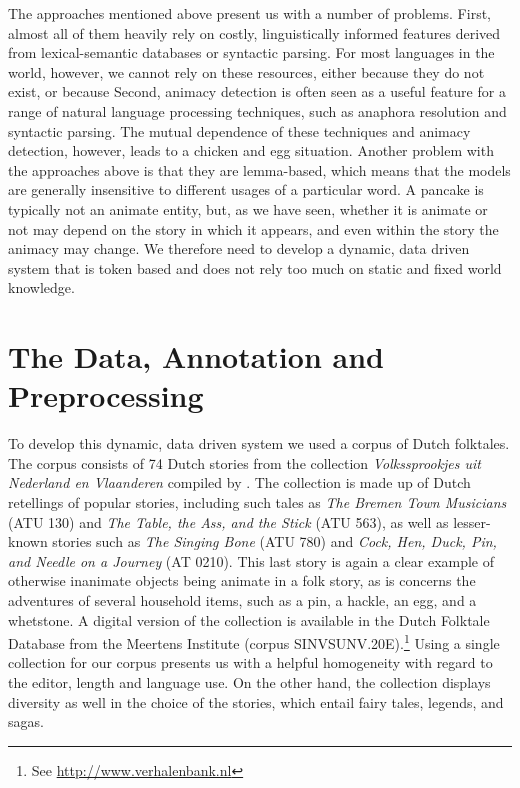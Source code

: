 \documentclass[a4paper,UKenglish]{oasics}
\begin{document}
The approaches mentioned above present us with a number of problems. First, almost all of them heavily rely on costly,
linguistically informed features derived from lexical-semantic
databases or syntactic parsing. For most languages in the world,
however, we cannot rely on these resources, either because they do not exist, or because %
Second, animacy detection is often seen as a useful feature for a range of natural language
processing techniques, such as anaphora resolution and syntactic
parsing. The mutual dependence of these techniques and animacy
detection, however, leads to a chicken and egg situation. Another
problem with the approaches above is that they are lemma-based, which
means that the models are generally insensitive to different usages of
a particular word. A pancake is typically not an animate entity, but,
as we have seen, whether it is animate or not may depend on the story in which it appears, and even within the story the animacy may change. We therefore need to
develop a dynamic, data driven system that is token based and does not
rely too much on static and fixed world knowledge.

\section{The Data, Annotation and Preprocessing}\label{sec:data}

To develop this dynamic, data driven system we used  a corpus of Dutch folktales. The corpus consists of 74 Dutch stories from the collection
\textit{Volkssprookjes uit Nederland en Vlaanderen} compiled by
\cite{sinninghe:78}. The collection is made up of Dutch retellings of popular stories, including such tales as \textit{The Bremen
  Town Musicians} (ATU 130) and \textit{The Table, the Ass, and the
  Stick } (ATU 563), as well as lesser-known stories such as
\textit{The Singing Bone} (ATU 780) and \textit{Cock, Hen, Duck, Pin, and Needle on a Journey} (AT 0210). This last story is again a clear example of otherwise inanimate objects being animate in a folk story, as is concerns the adventures of several household items, such as a pin, a hackle, an egg, and a whetstone. A digital version of the
collection is available in the Dutch Folktale Database from the
Meertens Institute (corpus SINVSUNV.20E).\footnote{See
\url{http://www.verhalenbank.nl}} Using a single collection for our corpus presents us with a helpful homogeneity with regard to the editor, length and language use. On the other hand, the collection displays diversity as well in the choice of the stories, which entail fairy tales, legends, and sagas.
\end{document}
